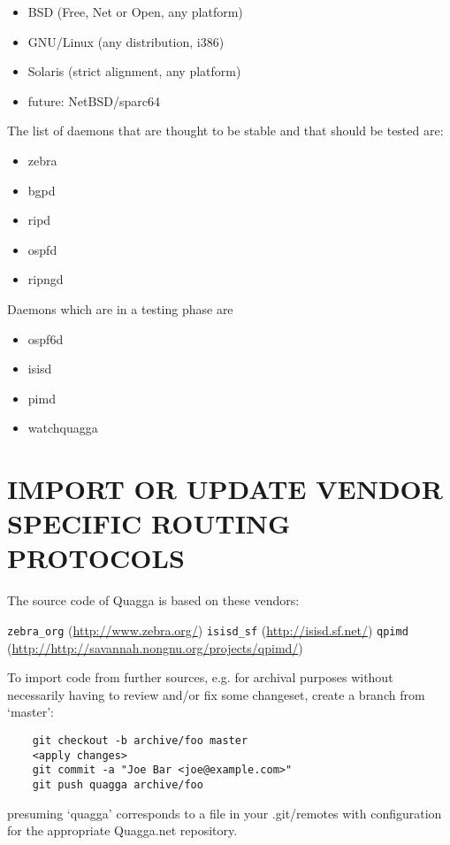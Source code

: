 \documentclass[oneside]{article}
\begin{document}
\begin{itemize}
  \item BSD (Free, Net or Open, any platform)
  \item GNU/Linux (any distribution, i386)
  \item Solaris (strict alignment, any platform)
  \item future: NetBSD/sparc64
\end{itemize}

The list of daemons that are thought to be stable and that should be
tested are:

\begin{itemize}
  \item zebra
  \item bgpd
  \item ripd
  \item ospfd
  \item ripngd
\end{itemize}
Daemons which are in a testing phase are

\begin{itemize}
  \item ospf6d
  \item isisd
  \item pimd
  \item watchquagga
\end{itemize}

\section{IMPORT OR UPDATE VENDOR SPECIFIC ROUTING PROTOCOLS}

The source code of Quagga is based on these vendors:

   \verb|zebra_org| (\url{http://www.zebra.org/})
   \verb|isisd_sf| (\url{http://isisd.sf.net/})
   \verb|qpimd| (\url{http://http://savannah.nongnu.org/projects/qpimd/})

To import code from further sources, e.g. for archival purposes without
necessarily having to review and/or fix some changeset, create a branch from
`master':

\begin{verbatim}
	git checkout -b archive/foo master
	<apply changes>
	git commit -a "Joe Bar <joe@example.com>"
	git push quagga archive/foo
\end{verbatim}

presuming `quagga' corresponds to a file in your .git/remotes with
configuration for the appropriate Quagga.net repository.
\end{document}
